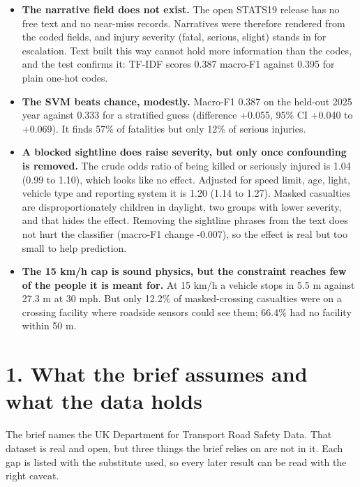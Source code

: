 \documentclass[10pt,a4paper]{article}
\begin{document}
\begin{itemize}\item \textbf{The narrative field does not exist.} The open STATS19 release has no free text and no near-miss records. Narratives were therefore rendered from the coded fields, and injury severity (fatal, serious, slight) stands in for escalation. Text built this way cannot hold more information than the codes, and the test confirms it: TF-IDF scores 0.387 macro-F1 against 0.395 for plain one-hot codes.
\item \textbf{The SVM beats chance, modestly.} Macro-F1 0.387 on the held-out 2025 year against 0.333 for a stratified guess (difference +0.055, 95\% CI +0.040 to +0.069). It finds 57\% of fatalities but only 12\% of serious injuries.
\item \textbf{A blocked sightline does raise severity, but only once confounding is removed.} The crude odds ratio of being killed or seriously injured is 1.04 (0.99 to 1.10), which looks like no effect. Adjusted for speed limit, age, light, vehicle type and reporting system it is 1.20 (1.14 to 1.27). Masked casualties are disproportionately children in daylight, two groups with lower severity, and that hides the effect. Removing the sightline phrases from the text does not hurt the classifier (macro-F1 change -0.007), so the effect is real but too small to help prediction.
\item \textbf{The 15 km/h cap is sound physics, but the constraint reaches few of the people it is meant for.} At 15 km/h a vehicle stops in 5.5 m against 27.3 m at 30 mph. But only 12.2\% of masked-crossing casualties were on a crossing facility where roadside sensors could see them; 66.4\% had no facility within 50 m.
\end{itemize}

\section*{1. What the brief assumes and what the data holds}

The brief names the UK Department for Transport Road Safety Data. That dataset is real and open, but three things the brief relies on are not in it. Each gap is listed with the substitute used, so every later result can be read with the right caveat.\par
\end{document}
